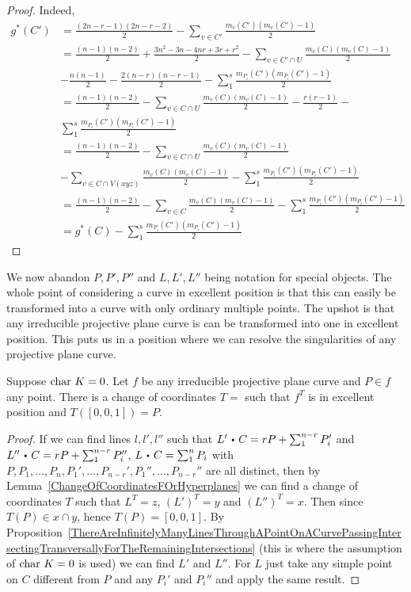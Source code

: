     \begin{proof}
        Indeed,
        \begin{align*}
            g^\ast(C') &= \frac{(2n-r-1)(2n-r-2)}{2}-\sum_{v\in C'}\frac{m_v(C')(m_v(C')-1)}{2}\\
            &=  \frac{(n-1)(n-2)}{2}+\frac{3n^2-3n-4nr+3r+r^2}{2}-\sum_{v\in C'\cap U}\frac{m_v(C)(m_v(C)-1)}{2}\\
            & -\frac{n(n-1)}{2}-\frac{2(n-r)(n-r-1)}{2}-\sum_1^s \frac{m_{P_i}(C')(m_{P_i}(C')-1)}{2}\\
            &= \frac{(n-1)(n-2)}{2}-\sum_{v\in C\cap U}\frac{m_v(C)(m_v(C)-1)}{2}-\frac{r(r-1)}{2}-\\ 
            &\sum_1^s \frac{m_{P_i}(C')(m_{P_i}(C')-1)}{2}\\
            &= \frac{(n-1)(n-2)}{2} - \sum_{v\in C\cap U}\frac{m_v(C)(m_v(C)-1)}{2} \\& -\sum_{v\in C\cap V(xyz)} \frac{m_v(C)(m_v(C)-1)}{2}- \sum_1^s \frac{m_{P_i}(C')(m_{P_i}(C')-1)}{2}\\
            &= \frac{(n-1)(n-2)}{2} - \sum_{v\in C} \frac{m_v(C)(m_v(C)-1)}{2} - \sum_1^s \frac{m_{P_i}(C')(m_{P_i}(C')-1)}{2}\\
            &= g^\ast(C)-\sum_1^s \frac{m_{P_i}(C')(m_{P_i}(C')-1)}{2}
        \end{align*}
    \end{proof}
    We now abandon $P,P',P''$ and $L,L',L''$ being notation for special objects. The whole point of considering a curve in excellent position is that this can easily be transformed into a curve with only ordinary multiple points. The upshot is that any irreducible projective plane curve is can be transformed into one in excellent position. This puts us in a position where we can resolve the singularities of any projective plane curve. 
    \begin{lemma}\label{ThereIsAlwaysAQuadraticTransformation}
        Suppose $\Char\ K =0$. Let $f$ be any irreducible projective plane curve and $P\in f$ any point. There is a change of coordinates $T=$ such that $f^T$ is in excellent position and $T([0,0,1])=P$.
    \end{lemma}
    \begin{proof}
        If we can find lines $l,l',l''$ such that 
        $L'\ic C = rP+\sum_1^{n-r} P_i'$ and $L''\ic C = rP+\sum_1^{n-r} P_i''$, $L\ic C  =\sum_1^n P_i$ with $P,P_1,\dots,P_n,P_1',\dots,P_{n-r}',P_{1}'',\dots,P_{n-r}''$ are all distinct, then by Lemma~\ref{ChangeOfCoordinatesFOrHyperplanes} we can find a change of coordinates $T$ such that $L^T = z$, $(L')^T=y$ and $(L'')^T=x$. Then since $T(P)\in x\cap y$, hence $T(P)=[0,0,1]$. By Proposition~\ref{ThereAreInfinitelyManyLinesThroughAPointOnACurvePassingIntersectingTransversallyForTheRemainingIntersections} (this is where the assumption of $\Char\ K=0$ is used) we can find $L'$ and $L''$. For $L$ just take any simple point on $C$ different from $P$ and any $P_i'$ and $P_i''$ and apply the same result. 
    \end{proof}
